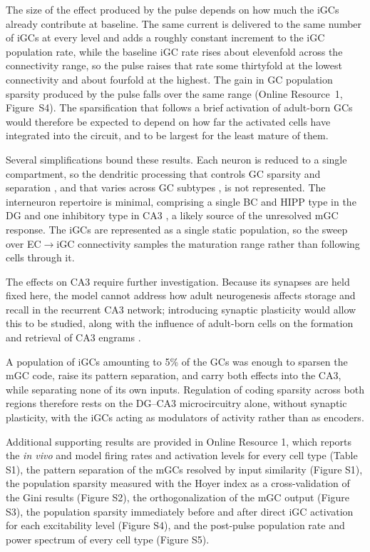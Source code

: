 \documentclass[pdflatex,sn-basic]{sn-jnl}%
\theoremstyle{thmstyleone}%
\theoremstyle{thmstyletwo}%
\theoremstyle{thmstylethree}%
\begin{document}
The size of the effect produced by the pulse depends on how much the iGCs already contribute at baseline. The same current is
delivered to the same number of iGCs at every level and adds a roughly constant increment to the iGC population rate, while the
baseline iGC rate rises about elevenfold across the connectivity range, so the pulse raises that rate some thirtyfold at the
lowest connectivity and about fourfold at the highest. The gain in GC population sparsity produced by the pulse falls over the
same range (Online Resource~1, Figure~S4). The sparsification that follows a brief activation of adult-born GCs would therefore be
expected to depend on how far the activated cells have integrated into the circuit, and to be largest for the least mature of
them.

Several simplifications bound these results. Each neuron is reduced to a single compartment, so the dendritic processing that
controls GC sparsity and separation \citep{chavlisDendrites2017}, and that varies across GC subtypes \citep{maoExcitatory2025}, is
not represented. The interneuron repertoire is minimal, comprising a single BC and HIPP type in the DG and one inhibitory type in
CA3 \citep{kopsickFormation2024}, a likely source of the unresolved mGC response. The iGCs are represented as a single static
population, so the sweep over EC$\to$iGC connectivity samples the maturation range rather than following cells through it.

The effects on CA3 require further investigation. Because its synapses are held fixed here, the model cannot address how adult
neurogenesis affects storage and recall in the recurrent CA3 network; introducing synaptic plasticity would allow this to be
studied, along with the influence of adult-born cells on the formation and retrieval of CA3 engrams \citep{rollsMechanisms2013,
kopsickFormation2024, koSystems2025}.

A population of iGCs amounting to 5\% of the GCs was enough to sparsen the mGC code, raise its pattern separation, and carry both
effects into the CA3, while separating none of its own inputs. Regulation of coding sparsity across both regions therefore rests
on the DG--CA3 microcircuitry alone, without synaptic plasticity, with the iGCs acting as modulators of activity rather than as
encoders.


\backmatter{}


Additional supporting results are provided in Online Resource 1, which reports the \textit{in vivo} and model firing rates and
activation levels for every cell type (Table S1), the pattern separation of the mGCs resolved by input similarity
(Figure S1), the population sparsity measured with the Hoyer index as a cross-validation of the Gini results (Figure S2), the
orthogonalization of the mGC output (Figure S3), the population sparsity immediately before and after direct
iGC activation for each excitability level (Figure S4), and the post-pulse population rate and power spectrum of every cell type
(Figure S5).
\end{document}
